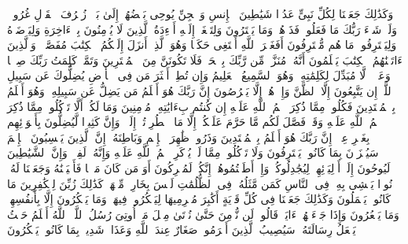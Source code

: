 \startbuffer[\q:6:112]
وَكَذَٰلِكَ جَعَلۡنَا لِكُلِّ نَبِیٍّ عَدُوࣰّا شَیَٰطِینَ ٱلۡإِنسِ وَٱلۡجِنِّ یُوحِی بَعۡضُهُمۡ إِلَىٰ بَعۡضࣲ زُخۡرُفَ ٱلۡقَوۡلِ غُرُورࣰاۚ وَلَوۡ شَاۤءَ رَبُّكَ مَا فَعَلُوهُۖ فَذَرۡهُمۡ وَمَا یَفۡتَرُونَ%
\stopbuffer
\startbuffer[\q:6:113]
وَلِتَصۡغَىٰۤ إِلَیۡهِ أَفۡءِدَةُ ٱلَّذِینَ لَا یُؤۡمِنُونَ بِٱلۡءَاخِرَةِ وَلِیَرۡضَوۡهُ وَلِیَقۡتَرِفُوا۟ مَا هُم مُّقۡتَرِفُونَ%
\stopbuffer
\startbuffer[\q:6:114]
أَفَغَیۡرَ ٱللَّهِ أَبۡتَغِی حَكَمࣰا وَهُوَ ٱلَّذِیۤ أَنزَلَ إِلَیۡكُمُ ٱلۡكِتَٰبَ مُفَصَّلࣰاۚ وَٱلَّذِینَ ءَاتَیۡنَٰهُمُ ٱلۡكِتَٰبَ یَعۡلَمُونَ أَنَّهُۥ مُنَزَّلࣱ مِّن رَّبِّكَ بِٱلۡحَقِّۖ فَلَا تَكُونَنَّ مِنَ ٱلۡمُمۡتَرِینَ%
\stopbuffer
\startbuffer[\q:6:115]
وَتَمَّتۡ كَلِمَتُ رَبِّكَ صِدۡقࣰا وَعَدۡلࣰاۚ لَّا مُبَدِّلَ لِكَلِمَٰتِهِۦۚ وَهُوَ ٱلسَّمِیعُ ٱلۡعَلِیمُ%
\stopbuffer
\startbuffer[\q:6:116]
وَإِن تُطِعۡ أَكۡثَرَ مَن فِی ٱلۡأَرۡضِ یُضِلُّوكَ عَن سَبِیلِ ٱللَّهِۚ إِن یَتَّبِعُونَ إِلَّا ٱلظَّنَّ وَإِنۡ هُمۡ إِلَّا یَخۡرُصُونَ%
\stopbuffer
\startbuffer[\q:6:117]
إِنَّ رَبَّكَ هُوَ أَعۡلَمُ مَن یَضِلُّ عَن سَبِیلِهِۦۖ وَهُوَ أَعۡلَمُ بِٱلۡمُهۡتَدِینَ%
\stopbuffer
\startbuffer[\q:6:118]
فَكُلُوا۟ مِمَّا ذُكِرَ ٱسۡمُ ٱللَّهِ عَلَیۡهِ إِن كُنتُم بِءَایَٰتِهِۦ مُؤۡمِنِینَ%
\stopbuffer
\startbuffer[\q:6:119]
وَمَا لَكُمۡ أَلَّا تَأۡكُلُوا۟ مِمَّا ذُكِرَ ٱسۡمُ ٱللَّهِ عَلَیۡهِ وَقَدۡ فَصَّلَ لَكُم مَّا حَرَّمَ عَلَیۡكُمۡ إِلَّا مَا ٱضۡطُرِرۡتُمۡ إِلَیۡهِۗ وَإِنَّ كَثِیرࣰا لَّیُضِلُّونَ بِأَهۡوَاۤئِهِم بِغَیۡرِ عِلۡمٍۚ إِنَّ رَبَّكَ هُوَ أَعۡلَمُ بِٱلۡمُعۡتَدِینَ%
\stopbuffer
\startbuffer[\q:6:120]
وَذَرُوا۟ ظَٰهِرَ ٱلۡإِثۡمِ وَبَاطِنَهُۥۤۚ إِنَّ ٱلَّذِینَ یَكۡسِبُونَ ٱلۡإِثۡمَ سَیُجۡزَوۡنَ بِمَا كَانُوا۟ یَقۡتَرِفُونَ%
\stopbuffer
\startbuffer[\q:6:121]
وَلَا تَأۡكُلُوا۟ مِمَّا لَمۡ یُذۡكَرِ ٱسۡمُ ٱللَّهِ عَلَیۡهِ وَإِنَّهُۥ لَفِسۡقࣱۗ وَإِنَّ ٱلشَّیَٰطِینَ لَیُوحُونَ إِلَىٰۤ أَوۡلِیَاۤئِهِمۡ لِیُجَٰدِلُوكُمۡۖ وَإِنۡ أَطَعۡتُمُوهُمۡ إِنَّكُمۡ لَمُشۡرِكُونَ%
\stopbuffer
\startbuffer[\q:6:122]
أَوَ مَن كَانَ مَیۡتࣰا فَأَحۡیَیۡنَٰهُ وَجَعَلۡنَا لَهُۥ نُورࣰا یَمۡشِی بِهِۦ فِی ٱلنَّاسِ كَمَن مَّثَلُهُۥ فِی ٱلظُّلُمَٰتِ لَیۡسَ بِخَارِجࣲ مِّنۡهَاۚ كَذَٰلِكَ زُیِّنَ لِلۡكَٰفِرِینَ مَا كَانُوا۟ یَعۡمَلُونَ%
\stopbuffer
\startbuffer[\q:6:123]
وَكَذَٰلِكَ جَعَلۡنَا فِی كُلِّ قَرۡیَةٍ أَكَٰبِرَ مُجۡرِمِیهَا لِیَمۡكُرُوا۟ فِیهَاۖ وَمَا یَمۡكُرُونَ إِلَّا بِأَنفُسِهِمۡ وَمَا یَشۡعُرُونَ%
\stopbuffer
\startbuffer[\q:6:124]
وَإِذَا جَاۤءَتۡهُمۡ ءَایَةࣱ قَالُوا۟ لَن نُّؤۡمِنَ حَتَّىٰ نُؤۡتَىٰ مِثۡلَ مَاۤ أُوتِیَ رُسُلُ ٱللَّهِۘ ٱللَّهُ أَعۡلَمُ حَیۡثُ یَجۡعَلُ رِسَالَتَهُۥۗ سَیُصِیبُ ٱلَّذِینَ أَجۡرَمُوا۟ صَغَارٌ عِندَ ٱللَّهِ وَعَذَابࣱ شَدِیدُۢ بِمَا كَانُوا۟ یَمۡكُرُونَ%
